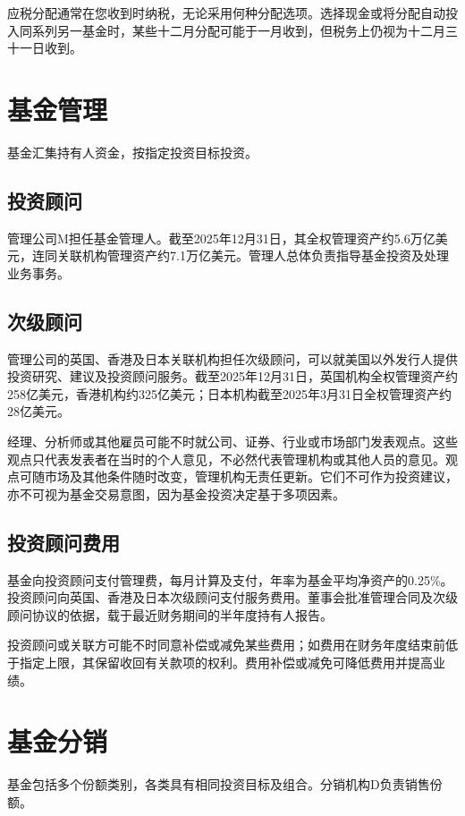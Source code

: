 \documentclass[UTF8,fontset=none,11pt,a4paper]{ctexart}
\begin{document}
应税分配通常在您收到时纳税，无论采用何种分配选项。选择现金或将分配自动投入同系列另一基金时，某些十二月分配可能于一月收到，但税务上仍视为十二月三十\allowbreak\mbox{一日收到。}


\section*{基金管理}
基金汇集持有人资金，按指定投资\allowbreak\mbox{目标投资。}


\subsection*{投资顾问}
管理公司M担任基金管理人。截至2025年12月31日，其全权管理资产约5.6万亿美元，连同关联机构管理资产约7.1万亿美元。管理人总体负责指导基金投资及处理业\allowbreak\mbox{务事务。}


\subsection*{次级顾问}
管理公司的英国、香港及日本关联机构担任次级顾问，可以就美国以外发行人提供投资研究、建议及投资顾问服务。截至2025年12月31日，英国机构全权管理资产约258亿美元，香港机构约325亿美元；日本机构截至2025年3月31日全权管理资产约28亿美元。


经理、分析师或其他雇员可能不时就公司、证券、行业或市场部门发表观点。这些观点只代表发表者在当时的个人意见，不必然代表管理机构或其他人员的意见。观点可随市场及其他条件随时改变，管理机构无责任更新。它们不可作为投资建议，亦不可视为基金交易意图，因为基金投资决定基于\allowbreak\mbox{多项因素。}


\subsection*{投资顾问费用}
基金向投资顾问支付管理费，每月计算及支付，年率为基金平均净资产的0.25\%。投资顾问向英国、香港及日本次级顾问支付服务费用。董事会批准管理合同及次级顾问协议的依据，载于最近财务期间的半年度持有人报告。


投资顾问或关联方可能不时同意补偿或减免某些费用；如费用在财务年度结束前低于指定上限，其保留收回有关款项的权利。费用补偿或减免可降低费用并\allowbreak\mbox{提高业绩。}


\section*{基金分销}
基金包括多个份额类别，各类具有相同投资目标及组合。分销机构D负责\allowbreak\mbox{销售份额。}
\end{document}
